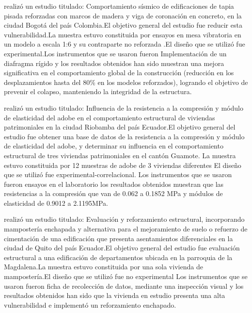\cite{LopezP.2020} realizó un estudio titulado: Comportamiento sísmico de edificaciones de tapia pisada reforzadas con marcos de madera y viga de coronación en concreto, en la ciudad Bogotá del país Colombia.El objetivo general del estudio fue reducir esta vulnerabilidad.La muestra estuvo constituida por  ensayos en mesa vibratoria en un modelo a escala 1:6 y su contraparte no reforzada .El diseño que se utilizó fue experimental.Los instrumentos que se usaron fueron Implementación de un diafragma rígido y los resultados obtenidos han sido  muestran una mejora significativa en el comportamiento global de la construcción (reducción en los desplazamientos hasta del 80\% en los modelos reforzados), logrando el objetivo de prevenir el colapso, manteniendo la integridad de la estructura.

\cite{TorresMoreno2022} realizó un estudio titulado: Influencia de la resistencia a la compresión y módulo de elasticidad del adobe en el comportamiento estructural de viviendas patrimoniales en la ciudad Riobamba del país Ecuador.El objetivo general del estudio fue obtener una base de datos de la resistencia a la compresión y módulo de elasticidad del adobe, y determinar su influencia en el comportamiento estructural de tres viviendas patrimoniales en el cantón Guamote. La muestra estuvo constituida por 12 muestras de adobe de 3 viviendas diferentes El diseño que se utilizó fue experimental-correlacional. Los instrumentos que se usaron fueron ensayos en el laboratorio  los resultados obtenidos muestran que las resistencias a la compresión que van de 0.062 a 0.1852 MPa y módulos de elasticidad de 0.9012 a 2.1195MPa. 

\cite{AmaguayBermeo2022} realizó un estudio titulado: Evaluación y reforzamiento estructural, incorporando mampostería enchapada y alternativa para el mejoramiento de suelo o refuerzo de cimentación de una edificación que presenta asentamientos diferenciales en la ciudad de Quito del país Ecuador.El objetivo general del estudio fue evaluación estructural a una edificación de departamentos ubicada en la parroquia de la Magdalena.La muestra estuvo constituida por una sola vivienda de mampostería.El diseño que se utilizó fue no experimental Los instrumentos que se usaron fueron ficha de recolección de datos, mediante una inspección visual y los resultados obtenidos han sido que la vivienda en estudio presenta una alta vulnerabilidad e implementó un reforzamiento enchapado.

